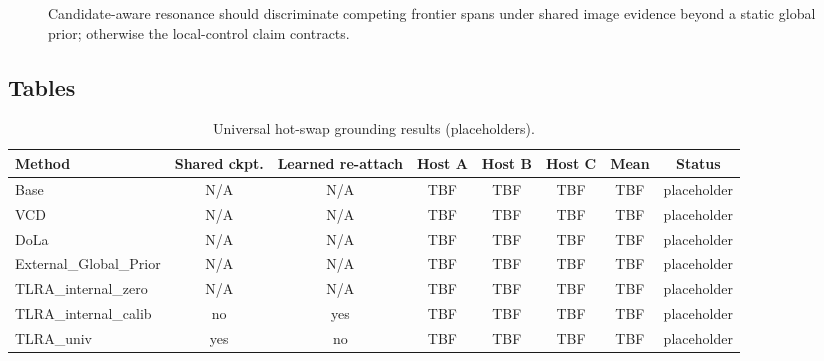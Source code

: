 \begin{figure}[t]
  \centering
  \caption{Candidate-aware resonance should discriminate competing frontier spans under shared image evidence beyond a static global prior; otherwise the local-control claim contracts.}
  \label{fig:global}
\end{figure}

\subsection{Tables}

\begin{table}[t]
  \caption{Universal hot-swap grounding results (placeholders).}
  \label{tab:hotswap}
  \centering
  \small
  \begin{tabular}{@{}lccccccc@{}}
    \toprule
    Method & Shared ckpt. & Learned re-attach & Host A & Host B & Host C & Mean & Status \\
    \midrule
    Base & N/A & N/A & TBF & TBF & TBF & TBF & placeholder \\
    VCD & N/A & N/A & TBF & TBF & TBF & TBF & placeholder \\
    DoLa & N/A & N/A & TBF & TBF & TBF & TBF & placeholder \\
    External\_Global\_Prior & N/A & N/A & TBF & TBF & TBF & TBF & placeholder \\
    TLRA\_internal\_zero & N/A & N/A & TBF & TBF & TBF & TBF & placeholder \\
    TLRA\_internal\_calib & no & yes & TBF & TBF & TBF & TBF & placeholder \\
    TLRA\_univ & yes & no & TBF & TBF & TBF & TBF & placeholder \\
    \bottomrule
  \end{tabular}
\end{table}

